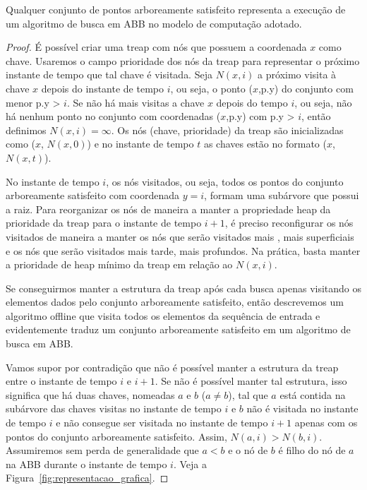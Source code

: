 \begin{lemma}Qualquer conjunto de pontos arboreamente satisfeito representa a execução de um algoritmo de busca em ABB no modelo de computação adotado.
\end{lemma}

\begin{proof}

É possível criar uma treap com nós que possuem a coordenada $x$ como chave. Usaremos o campo prioridade dos nós da treap para representar o próximo instante de tempo que tal chave é visitada. Seja $N(x,i)$ a próximo visita à chave $x$ depois do instante de tempo $i$, ou seja, o ponto ($x$,p.y) do conjunto com menor p.y > $i$. Se não há mais visitas a chave $x$ depois do tempo $i$, ou seja, não há nenhum ponto no conjunto com coordenadas ($x$,p.y) com p.y > $i$, então definimos $N(x,i) = \infty$. Os nós (chave, prioridade) da treap são inicializadas como ($x$, $N(x,0)$) e no instante de tempo $t$ as chaves estão no formato ($x$, $N(x,t)$).

No instante de tempo $i$, os nós visitados, ou seja, todos os pontos do conjunto arboreamente satisfeito com coordenada $y=i$, formam uma subárvore que possui a raiz. Para reorganizar os nós de maneira a manter a propriedade heap da prioridade da treap para o instante de tempo $i+1$, é preciso reconfigurar os nós visitados de maneira a manter os nós que serão visitados mais , mais superficiais e os nós que serão visitados mais tarde, mais profundos. Na prática, basta manter a prioridade de heap mínimo da treap em relação ao $N(x,i)$.

Se conseguirmos manter a estrutura da treap após cada busca apenas visitando os elementos dados pelo conjunto arboreamente satisfeito, então descrevemos um algoritmo offline que visita todos os elementos da sequência de entrada e evidentemente traduz um conjunto arboreamente satisfeito em um algoritmo de busca em ABB.

Vamos supor por contradição que não é possível manter a estrutura da treap entre o instante de tempo $i$ e $i+1$. Se não é possível manter tal estrutura, isso significa que há duas chaves, nomeadas $a$ e $b$ ($a \neq b$), tal que $a$ está contida na subárvore das chaves visitas no instante de tempo $i$ e $b$ não é visitada no instante de tempo $i$ e não consegue ser visitada no instante de tempo $i+1$ apenas com os pontos do conjunto arboreamente satisfeito. Assim, $N(a,i) > N(b,i)$. Assumiremos sem perda de generalidade que $a < b$ e o nó de $b$ é filho do nó de $a$ na ABB durante o instante de tempo $i$. Veja a Figura~\ref{fig:representacao_grafica}.


\end{proof}
